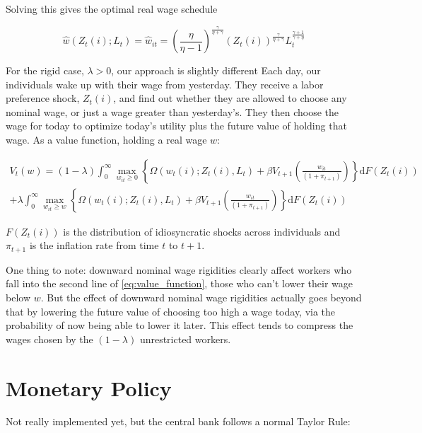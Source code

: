 \documentclass[12pt,a4paper]{scrartcl}            %
\begin{document}
Solving this gives the optimal real wage schedule

\begin{equation}
    \label{eq:flex}
    \hat{w}(Z_t(i); L_t) = \hat{w}_{it} = \left( \frac{\eta}{\eta - 1} \right)^{\frac{\gamma}{\eta + \gamma}}\left( Z_t(i) \right)^{\frac{\gamma}{\eta + \gamma}} L_t^{\frac{\gamma + 1}{\gamma + \eta}}
\end{equation}

For the rigid case, $\lambda > 0$, our approach is slightly different
Each day, our individuals wake up with their wage from yesterday.
They receive a labor preference shock, $Z_t(i)$, and find out whether they are allowed to choose any nominal wage, or just a wage greater than yesterday's.
They then choose the wage for today to optimize today's utility plus the future value of holding that wage.
As a value function, holding a real wage $w$:

\begin{multline}
    \label{eq:value_function}
    V_t(w) = (1 - \lambda) \int_{0}^{\infty} \max_{w_{it} \geq 0} \left\{ \Omega( w_t(i); Z_t(i), L_t ) + \beta V_{t+1}\left( \frac{w_{it}}{(1 + \pi_{t+1})} \right) \right\} \mathrm{d}F(Z_t(i)) \\
                + \lambda  \int_{0}^{\infty} \max_{w_{it} \geq w} \left\{ \Omega( w_t(i); Z_t(i), L_t ) + \beta V_{t+1}\left( \frac{w_{it}}{(1 + \pi_{t+1})} \right) \right\} \mathrm{d}F(Z_t(i))
\end{multline}

$F(Z_t(i))$ is the distribution of idiosyncratic shocks across individuals and $\pi_{t+1}$ is the inflation rate from time $t$ to $t+1$.

One thing to note: downward nominal wage rigidities clearly affect workers who fall into the second line of \ref{eq:value_function}, those who can't lower their wage below $w$.
But the effect of downward nominal wage rigidities actually goes beyond that by lowering the future value of choosing too high a wage today, via the probability of now being able to lower it later.
This effect tends to compress the wages chosen by the $(1 - \lambda)$ unrestricted workers.

\section{Monetary Policy}
\label{sec:monetary_policy}

Not really implemented yet, but the central bank follows a normal Taylor Rule:
\end{document}

